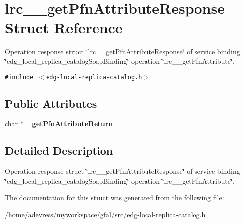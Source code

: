 \section{lrc\_\-\_\-get\-Pfn\-Attribute\-Response Struct Reference}
\label{structlrc____getPfnAttributeResponse}
Operation response struct \char`\"{}lrc\_\-\_\-get\-Pfn\-Attribute\-Response\char`\"{} of service binding \char`\"{}edg\_\-local\_\-replica\_\-catalog\-Soap\-Binding\char`\"{} operation \char`\"{}lrc\_\-\_\-get\-Pfn\-Attribute\char`\"{}.  


{\tt \#include $<$edg-local-replica-catalog.h$>$}

\subsection*{Public Attributes}
\begin{CompactItemize}
\item 
char $\ast$ \textbf{\_\-get\-Pfn\-Attribute\-Return}\label{structlrc____getPfnAttributeResponse_e6cba8841b096b841ec835119ebb7dfb}

\end{CompactItemize}


\subsection{Detailed Description}
Operation response struct \char`\"{}lrc\_\-\_\-get\-Pfn\-Attribute\-Response\char`\"{} of service binding \char`\"{}edg\_\-local\_\-replica\_\-catalog\-Soap\-Binding\char`\"{} operation \char`\"{}lrc\_\-\_\-get\-Pfn\-Attribute\char`\"{}. 



The documentation for this struct was generated from the following file:\begin{CompactItemize}
\item 
/home/adevress/myworkspace/gfal/src/edg-local-replica-catalog.h\end{CompactItemize}
